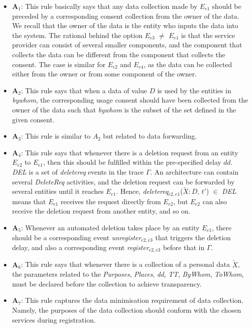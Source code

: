 \documentclass[a4paper]{article}
\begin{document}
\begin{itemize}

\item $\textbf{A}_1$: This rule basically says that any data collection made by $E_{e1}$ should be preceded by a corresponding consent collection from the owner of the data. We recall that the owner of the data is the entity who inputs the data into the system. The rational behind the option $E_{e3}$ $\neq$ $E_{e1}$ is that the service provider can consist of several smaller components, and the component that collects the data can be different from the component that collects the consent. The case is similar for $E_{e2}$ and $E_{e4}$, as the data can be collected either from the owner or from some component of the owner.  

\item $\textbf{A}_2$: This rule says that when a data of value $D$ is used by the entities in \textit{bywhom}, the corresponding usage consent should have been collected from the owner of the data such that \textit{bywhom} is the subset of the set defined in the given consent. 

\item $\textbf{A}_3$: This rule is similar to $A_2$ but related to data forwarding.  

\item $\textbf{A}_4$: This rule says that whenever there is a deletion request from an entity $E_{e2}$ to $E_{e1}$, then this should be fulfilled within the pre-specified delay $dd$.  \textit{DEL} is a set of \textit{deletereq} events in the trace $\Gamma$. An architecture can contain several \textit{DeleteReq} activities, and the deletion request can be forwarded by several entities until it reaches $E_{e1}$. Hence, \textit{deletereq}$_{e2,e1}$($\tilde{X} : D$, $t'$) $\in$ \textit{DEL} means that $E_{e1}$ receives the request directly from $E_{e2}$, but $E_{e2}$ can also receive the deletion request from  another entity, and so on.

\item $\textbf{A}_5$:  Whenever an automated deletion takes place by an entity $E_{e1}$, there should be a corresponding event \textit{unregister}$_{e2,e3}$ that triggers the deletion delay, and  
also a corresponding event \textit{register}$_{e2,e3}$ before that in $\Gamma$.

\item $\textbf{A}_6$:  This rule says that whenever there is a collection of a personal data $\tilde{X}$, the parameters related to the \textit{Purposes}, \textit{Places}, \textit{dd}, \textit{TT}, \textit{ByWhom}, \textit{ToWhom}, must be declared before the collection to achieve transparency.       

\item $\textbf{A}_7$:  This rule captures the data minimisation requirement of data collection. Namely, the purposes of the data collection should conform with the chosen services during registration. 
\end{itemize}  
\end{document}
